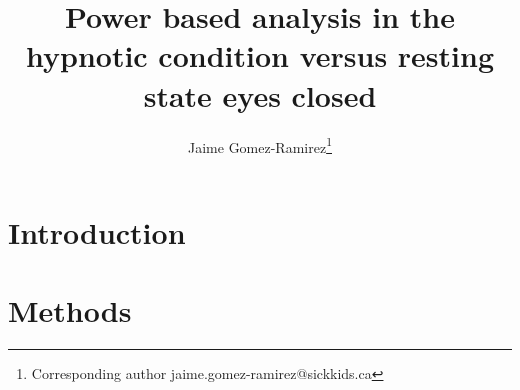 \documentclass[11pt, onecolumn]{article}
\begin{document}
\def\mean#1{\left< #1 \right>}
\title{Power based analysis in the hypnotic condition versus resting state eyes closed}

\author[1]{Jaime Gomez-Ramirez\thanks{Corresponding author \hspace{0.6cm} jaime.gomez-ramirez@sickkids.ca}}
\author[2]{}%
\affil[2]{}

\date{}
\maketitle

\begin{abstract}

\end{abstract}
\section{Introduction}
\label{se:intro}

\section{Methods}
\label{se:methods}
\end{document}
